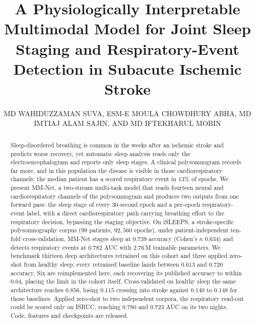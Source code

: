 \documentclass{ieeeaccess}
\newcommand{\mmAcc}{0.739}   %
\newcommand{\mmK}{0.634}     %
\newcommand{\mmAuc}{0.782}   %
\begin{document}

\title{A Physiologically Interpretable Multimodal Model for Joint Sleep Staging
and Respiratory-Event Detection in Subacute Ischemic Stroke}

\author{\uppercase{Md Wahiduzzaman Suva},
\uppercase{Esm-e Moula Chowdhury Abha},
\uppercase{Md Imtiaj Alam Sajin},
AND \uppercase{Md Iftekharul Mobin}}

\address[1]{Department of Computer Science and Engineering, American International
University-Bangladesh, Dhaka 1229, Bangladesh}



\titlepgskip=-21pt

\begin{abstract}
Sleep-disordered breathing is common in the weeks after an ischemic stroke and predicts
worse recovery, yet automatic sleep analysis reads only the electroencephalogram and
reports only sleep stages. A clinical polysomnogram records far more, and in this
population the disease is visible in those cardiorespiratory channels: the median patient
has a scored respiratory event in $13\%$ of epochs. We present MM-Net, a two-stream
multi-task model that reads fourteen neural and cardiorespiratory channels of the
polysomnogram and produces two outputs from one
forward pass: the sleep stage of every 30-second epoch and a per-epoch
respiratory-event label, with a direct cardiorespiratory path carrying breathing effort to
the respiratory decision, bypassing the staging objective. On iSLEEPS, a stroke-specific
polysomnography corpus ($99$ patients, $92{,}560$ epochs), under patient-independent ten-fold cross-validation, MM-Net stages sleep at
$\mmAcc$ accuracy (Cohen's $\kappa$ $\mmK$) and detects respiratory events at $\mmAuc$ AUC
with $2.76$\,M trainable parameters. We benchmark thirteen deep architectures retrained on
this cohort and three applied zero-shot from healthy sleep; every retrained baseline lands
between $0.613$ and $0.720$ accuracy. Six are reimplemented here, each recovering its published accuracy to within $0.04$,
placing the limit in the cohort itself. Cross-validated on healthy sleep
the same architecture reaches $0.856$, losing $0.115$ crossing into stroke against $0.140$
to $0.148$ for those baselines. Applied zero-shot to two independent corpora, the
respiratory read-out could be scored only on ISRUC, reaching $0.780$ and $0.723$ AUC on its
two nights. Code, features and checkpoints are released.
\end{abstract}
\end{document}
